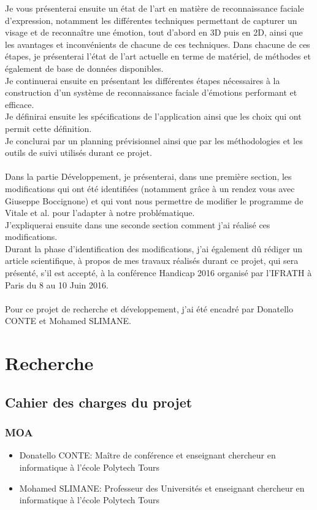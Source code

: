 \documentclass[poster]{polytech/polytech}
\begin{document}
Je vous présenterai ensuite un état de l'art en matière de reconnaissance faciale d'expression, notamment les différentes techniques permettant de capturer un visage et de reconnaître une émotion, tout d'abord en 3D puis en 2D, ainsi que les avantages et inconvénients de chacune de ces techniques. Dans chacune de ces étapes, je présenterai l'état de l'art actuelle en terme de matériel, de méthodes et également de base de données disponibles. \\
Je continuerai ensuite en présentant les différentes étapes nécessaires à la construction d'un système de reconnaissance faciale d'émotions performant et efficace.\\
Je définirai ensuite les spécifications de l'application ainsi que les choix qui ont permit cette définition.\\
Je conclurai par un planning prévisionnel ainsi que par les méthodologies et les outils de suivi utilisés durant ce projet.\\
\\
Dans la partie Développement, je présenterai, dans une première section, les modifications qui ont été identifiées (notamment grâce à un rendez vous avec Giuseppe Boccignone) et qui vont nous permettre de modifier le programme de Vitale et al. pour l'adapter à notre problématique.\\
J'expliquerai ensuite dans une seconde section comment j'ai réalisé ces modifications.\\
Durant la phase d'identification des modifications, j'ai également dû rédiger un article scientifique, à propos de mes travaux réalisés durant ce projet, qui sera présenté, s'il est accepté, à la conférence Handicap 2016 organisé par l'IFRATH à Paris du 8 au 10 Juin 2016.\\
\\
Pour ce projet de recherche et développement, j'ai été encadré par Donatello CONTE et Mohamed SLIMANE.


\part{Recherche}
\label{part:part_recherche}

\chapter{Cahier des charges du projet}
\label{chap:chap_cdc}

\section{MOA}
\begin{itemize}
\item Donatello CONTE: Maître de conférence et enseignant chercheur en informatique à l'école Polytech Tours
\item Mohamed SLIMANE: Professeur des Universités et enseignant chercheur en informatique à l'école Polytech Tours
\end{itemize}
\end{document}
